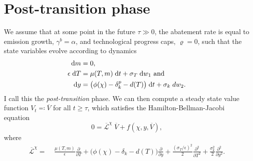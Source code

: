 \documentclass[../../main.tex]{subfiles}
\begin{document}
\section{Post-transition phase}

We assume that at some point in the future $\tau \gg 0$, the abatement rate is equal to emission growth, $\gamma^b = \alpha$, and technological progress caps, $\varrho = 0$, such that the state variables evolve according to dynamics \begin{align}
    \mathrm{d}m &= 0, \\
    \epsilon \; \mathrm{d}T &= \mu(T, m) \; \mathrm{d}t + \sigma_T \; \mathrm{d}w_1 \text{ and } \\
    \mathrm{d}y &= \big( \phi(\chi) - \delta_k^p - d(T) \big) \; \mathrm{d}t + \sigma_k \; d w_2.
\end{align} I call this the \textit{post-transition} phase. We can then compute a steady state value function $V_t \eqqcolon \overline{V}$ for all $t \geq \tau$, which satisfies the Hamilton-Bellman-Jacobi equation \begin{equation}
    0 = \overline{\mathcal{L}}^\chi \; \overline{V} + f(\chi, y, \overline{V}),
\end{equation} where \begin{equation}
    \begin{split}
        \overline{\mathcal{L}}^\chi = \; &\frac{\mu(T, m)}{\epsilon} \frac{\partial}{\partial T} + \Big(\phi(\chi) - \delta_k - d(T) \Big) \frac{\partial}{\partial y} + \frac{(\sigma_T / \epsilon)^2}{2} \frac{\partial^2}{\partial T^2} + \frac{\sigma^2_k}{2} \frac{\partial^2}{\partial y^2}.
    \end{split}
\end{equation}
\end{document}
